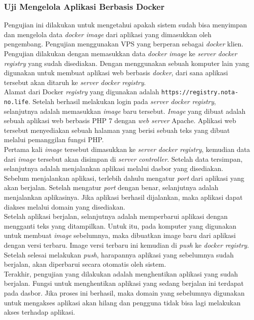         \subsubsection{Uji Mengelola Aplikasi Berbasis Docker} \label{ujimengelolaaplikasiberbasisdocker}
        	Pengujian ini dilakukan untuk mengetahui apakah sistem sudah bisa menyimpan dan mengelola data \textit{docker image} dari aplikasi yang dimasukkan oleh pengembang. Pengujian menggunakan VPS yang berperan sebagai \textit{docker} klien. Pengujian dilakukan dengan memasukkan data \textit{docker image} ke \textit{server docker registry} yang sudah disediakan. Dengan menggunakan sebuah komputer lain yang digunakan untuk membuat aplikasi web berbasis \textit{docker}, dari sana aplikasi tersebut akan ditaruh ke \textit{server docker registry}. \\
            \indent Alamat dari Docker \textit{registry} yang digunakan adalah \texttt{https://registry.nota-no.life}. Setelah berhasil melakukan login pada \textit{server docker registry}, selanjutnya adalah memasukkan \textit{image} baru tersebut. \textit{Image} yang dibuat adalah sebuah aplikasi web berbasis PHP 7 dengan \textit{web server} Apache. Aplikasi web tersebut menyediakan sebuah halaman yang berisi sebuah teks yang dibuat melalui pemanggilan fungsi PHP. \\
            \indent Pertama kali \textit{image} tersebut dimasukkan ke \textit{server docker registry}, kemudian data dari \textit{image} tersebut akan disimpan di \textit{server controller}. Setelah data tersimpan, selanjutnya adalah menjalankan aplikasi melalui dasbor yang disediakan. Sebelum menjalankan aplikasi, terlebih dahulu mengatur \textit{port} dari aplikasi yang akan berjalan. Setelah mengatur \textit{port} dengan benar, selanjutnya adalah menjalankan aplikasinya. Jika aplikasi berhasil dijalankan, maka aplikasi dapat diakses melalui domain yang disediakan. \\
            \indent Setelah aplikasi berjalan, selanjutnya adalah memperbarui aplikasi dengan mengganti teks yang ditampilkan. Untuk itu, pada komputer yang digunakan untuk membuat \textit{image} sebelumnya, maka dibuatkan image baru dari aplikasi dengan versi terbaru. Image versi terbaru ini kemudian di \textit{push} ke \textit{docker registry}. Setelah selesai melakukan \textit{push}, harapannya aplikasi yang sebelumnya sudah berjalan, akan diperbarui secara otomatis oleh sistem. \\
            \indent Terakhir, pengujian yang dilakukan adalah menghentikan aplikasi yang sudah berjalan. Fungsi untuk menghentikan aplikasi yang sedang berjalan ini terdapat pada dasbor. Jika proses ini berhasil, maka domain yang sebelumnya digunakan untuk mengakses aplikasi akan hilang dan pengguna tidak bisa lagi melakukan akses terhadap aplikasi. \\
